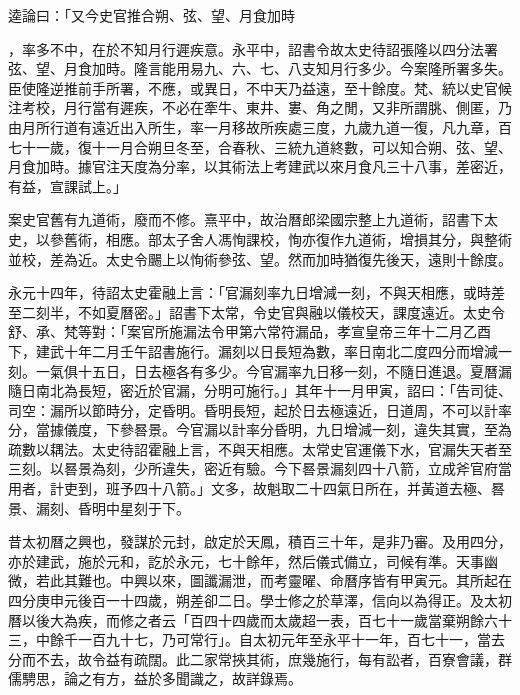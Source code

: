 \begin{pinyinscope}
逵論曰：「又今史官推合朔、弦、望、月食加時

，率多不中，在於不知月行遲疾意。永平中，詔書令故太史待詔張隆以四分法署弦、望、月食加時。隆言能用易九、六、七、八支知月行多少。今案隆所署多失。臣使隆逆推前手所署，不應，或異日，不中天乃益遠，至十餘度。梵、統以史官候注考校，月行當有遲疾，不必在牽牛、東井、婁、角之閒，又非所謂朓、側匿，乃由月所行道有遠近出入所生，率一月移故所疾處三度，九歲九道一復，凡九章，百七十一歲，復十一月合朔旦冬至，合春秋、三統九道終數，可以知合朔、弦、望、月食加時。據官注天度為分率，以其術法上考建武以來月食凡三十八事，差密近，有益，宣課試上。」

案史官舊有九道術，廢而不修。熹平中，故治曆郎梁國宗整上九道術，詔書下太史，以參舊術，相應。部太子舍人馮恂課校，恂亦復作九道術，增損其分，與整術並校，差為近。太史令颺上以恂術參弦、望。然而加時猶復先後天，遠則十餘度。

永元十四年，待詔太史霍融上言：「官漏刻率九日增減一刻，不與天相應，或時差至二刻半，不如夏曆密。」詔書下太常，令史官與融以儀校天，課度遠近。太史令舒、承、梵等對：「案官所施漏法令甲第六常符漏品，孝宣皇帝三年十二月乙酉下，建武十年二月壬午詔書施行。漏刻以日長短為數，率日南北二度四分而增減一刻。一氣俱十五日，日去極各有多少。今官漏率九日移一刻，不隨日進退。夏曆漏隨日南北為長短，密近於官漏，分明可施行。」其年十一月甲寅，詔曰：「告司徒、司空：漏所以節時分，定昏明。昏明長短，起於日去極遠近，日道周，不可以計率分，當據儀度，下參晷景。今官漏以計率分昏明，九日增減一刻，違失其實，至為疏數以耦法。太史待詔霍融上言，不與天相應。太常史官運儀下水，官漏失天者至三刻。以晷景為刻，少所違失，密近有驗。今下晷景漏刻四十八箭，立成斧官府當用者，計吏到，班予四十八箭。」文多，故魁取二十四氣日所在，并黃道去極、晷景、漏刻、昏明中星刻于下。

昔太初曆之興也，發謀於元封，啟定於天鳳，積百三十年，是非乃審。及用四分，亦於建武，施於元和，訖於永元，七十餘年，然后儀式備立，司候有準。天事幽微，若此其難也。中興以來，圖讖漏泄，而考靈曜、命曆序皆有甲寅元。其所起在四分庚申元後百一十四歲，朔差卻二日。學士修之於草澤，信向以為得正。及太初曆以後大為疾，而修之者云「百四十四歲而太歲超一表，百七十一歲當棄朔餘六十三，中餘千一百九十七，乃可常行」。自太初元年至永平十一年，百七十一，當去分而不去，故令益有疏闊。此二家常挾其術，庶幾施行，每有訟者，百寮會議，群儒騁思，論之有方，益於多聞識之，故詳錄焉。


\end{pinyinscope}
